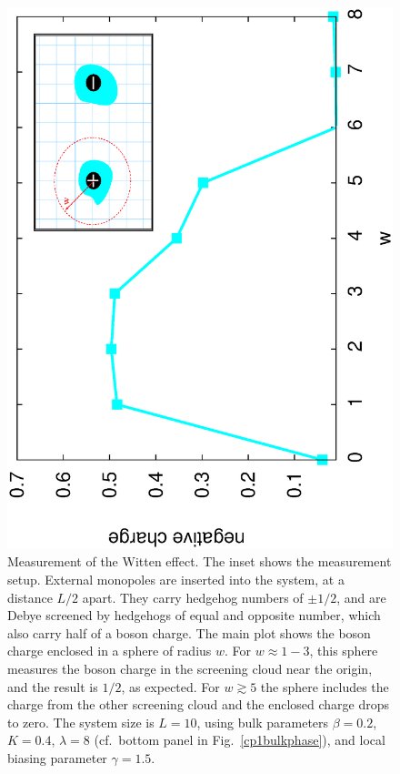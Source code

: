 \documentclass[prb,twocolumn]{revtex4-1}
\newcommand{\scripty}[1]{w}
\begin{document}
\begin{figure}
\includegraphics[angle=-90,width=\linewidth]{figures/wittenout.eps}
\caption{Measurement of the Witten effect. The inset shows the measurement setup. External monopoles are inserted into the system, at a distance $L/2$ apart. They carry hedgehog numbers of $\pm 1/2$, and are Debye screened by hedgehogs of equal and opposite number, which also carry half of a boson charge. The main plot shows the boson charge enclosed in a sphere of radius $\scripty{r}$. For $\scripty{r}\approx 1-3$, this sphere measures the boson charge in the screening cloud near the origin, and the result is $1/2$, as expected. For $\scripty{r}\gtrsim 5$ the sphere includes the charge from the other screening cloud and the enclosed charge drops to zero. The system size is $L=10$, using bulk parameters $\beta=0.2$, $K=0.4$, $\lambda=8$ (cf.~bottom panel in Fig.~\ref{cp1bulkphase}), and local biasing parameter $\gamma=1.5$.}
\label{witten}
\end{figure}
\end{document}
